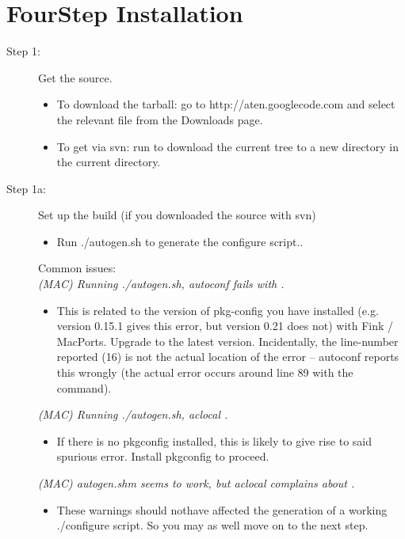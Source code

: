 \section{Four\textonehalf Step Installation}

\begin{description}
	\item[Step 1:\its] Get the source.
	\begin{itemize}
		\item To download the tarball: go to http://aten.googlecode.com and select the relevant file from the Downloads page.
		\item To get via {\sffamily svn}: run  to download the current tree to a new directory  in the current directory.
	\end{itemize}
\end{description}


\begin{description}
	\item[Step 1a:\its] Set up the build (if you downloaded the source with {\sffamily svn})
	\begin{itemize}
		\item Run {\sffamily ./autogen.sh} to generate the {\sffamily configure} script..
	\end{itemize}
	Common issues:\\
	\emph{(MAC) Running {\sffamily ./autogen.sh}, {\sffamily autoconf} fails with .}
	\begin{itemize}
		\item This is related to the version of pkg-config you have installed (e.g. version 0.15.1 gives this error, but version 0.21 does not) with Fink / MacPorts. Upgrade to the latest version. Incidentally, the line-number reported (16) is not the actual location of the error -- autoconf reports this wrongly (the actual error occurs around line 89 with the \qte{PKG\_CHECK\_MODULES(GTK28, ..., [AC\_DEFINE...} command).
	\end{itemize}
	\emph{(MAC) Running {\sffamily ./autogen.sh}, {\sffamily aclocal} .}
	\begin{itemize}
		\item If there is no {\sffamily pkgconfig} installed, this is likely to give rise to said spurious error. Install {\sffamily pkgconfig} to proceed.
	\end{itemize}
	\emph{(MAC) {\sffamily autogen.sh}m seems to work, but {\sffamily aclocal} complains about .}
	\begin{itemize}
		\item These warnings should nothave affected the generation of a working {\sffamily ./configure} script. So you may as well move on to the next step.
	\end{itemize}
\end{description}


